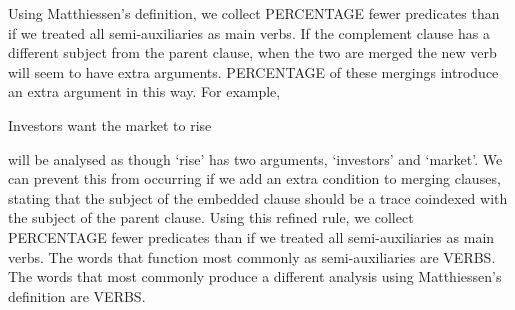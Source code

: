 \documentclass[11pt]{article}
\begin{document}
Using Matthiessen's definition, we collect PERCENTAGE fewer predicates than if we treated all semi-auxiliaries as main verbs. If the complement clause has a different subject from the parent clause, when the two are merged the new verb will seem to have extra arguments. PERCENTAGE of these mergings introduce an extra argument in this way. For example,

Investors want the market to rise

will be analysed as though `rise' has two arguments, `investors' and `market'. We can prevent this from occurring if we add an extra condition to merging clauses, stating that the subject of the embedded clause should be a trace coindexed with the subject of the parent clause. Using this refined rule, we collect PERCENTAGE fewer predicates than if we treated all semi-auxiliaries as main verbs. The words that function most commonly as semi-auxiliaries are VERBS. The words that most commonly produce a different analysis using Matthiessen's definition are VERBS.







\end{document}
